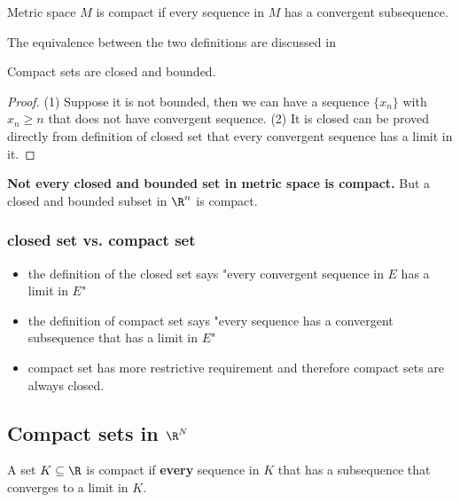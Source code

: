 \begin{refsection}
\begin{definition}
Metric space $M$ is compact if every sequence in $M$ has a convergent subsequence.
\end{definition}

\begin{remark}
The equivalence between the two definitions are discussed in \cite[150]{johnsonbaugh2010foundations}
\end{remark}


\begin{theorem}
Compact sets are closed and bounded.
\end{theorem}
\begin{proof}
(1) Suppose it is not bounded, then we can have a sequence $\{x_n\}$ with $x_n \geq n$ that does not have convergent sequence. (2) It is closed can be proved directly from definition of closed set that every convergent sequence has a limit in it. 	
\end{proof}
 


\begin{remark}\textbf{Not every closed and bounded set in metric space is compact.} But a closed and bounded subset in $\R^n$ is compact.
\end{remark}

\subsubsection{closed set vs. compact set}
\begin{itemize}
    \item the definition of the closed set says "every convergent sequence in $E$ has a limit in $E$"
    \item the definition of compact set says "every sequence has a convergent subsequence that has a limit in $E$"
    \item compact set has more restrictive requirement and therefore compact sets are always closed. 
\end{itemize}




\subsection{Compact sets in $\R^N$}

\begin{definition}
\cite[96]{abbott2001understanding} A set $K\subseteq \R$ is compact if \textbf{every} sequence in $K$ that has a subsequence that converges to a limit in $K$.
\end{definition}





\end{refsection}
